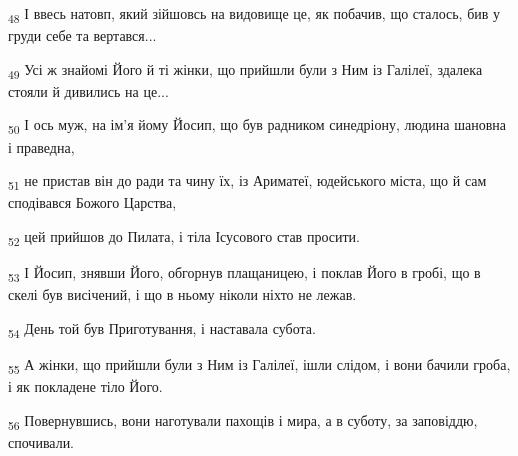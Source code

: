 \begin{tcolorbox}
\textsubscript{48} І ввесь натовп, який зійшовсь на видовище це, як побачив, що сталось, бив у груди себе та вертався...
\end{tcolorbox}
\begin{tcolorbox}
\textsubscript{49} Усі ж знайомі Його й ті жінки, що прийшли були з Ним із Галілеї, здалека стояли й дивились на це...
\end{tcolorbox}
\begin{tcolorbox}
\textsubscript{50} І ось муж, на ім'я йому Йосип, що був радником синедріону, людина шановна і праведна,
\end{tcolorbox}
\begin{tcolorbox}
\textsubscript{51} не пристав він до ради та чину їх, із Ариматеї, юдейського міста, що й сам сподівався Божого Царства,
\end{tcolorbox}
\begin{tcolorbox}
\textsubscript{52} цей прийшов до Пилата, і тіла Ісусового став просити.
\end{tcolorbox}
\begin{tcolorbox}
\textsubscript{53} І Йосип, знявши Його, обгорнув плащаницею, і поклав Його в гробі, що в скелі був висічений, і що в ньому ніколи ніхто не лежав.
\end{tcolorbox}
\begin{tcolorbox}
\textsubscript{54} День той був Приготування, і наставала субота.
\end{tcolorbox}
\begin{tcolorbox}
\textsubscript{55} А жінки, що прийшли були з Ним із Галілеї, ішли слідом, і вони бачили гроба, і як покладене тіло Його.
\end{tcolorbox}
\begin{tcolorbox}
\textsubscript{56} Повернувшись, вони наготували пахощів і мира, а в суботу, за заповіддю, спочивали.
\end{tcolorbox}
